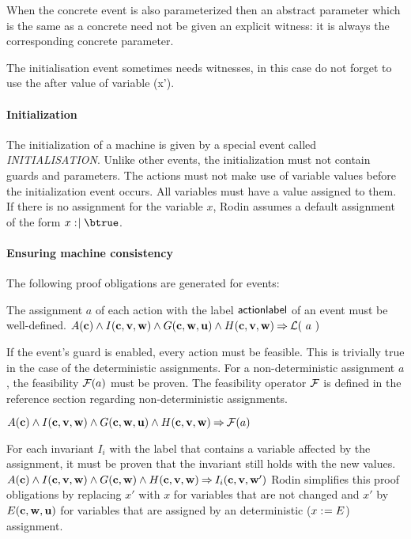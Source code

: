 When the concrete event is also parameterized then an abstract parameter which is the same as a concrete need not be given an explicit witness: it is always the corresponding concrete parameter.

The initialisation event sometimes needs witnesses, in this case do not forget to use the after value of variable (x'). 

\paragraph{Initialization}
The initialization of a machine is given by a special event called \textsl{INITIALISATION}.
Unlike other events, the initialization must not contain guards and parameters.
The actions must not make use of variable values before the initialization event occurs.
All variables must have a value assigned to them. If there is no assignment for the variable $x$, Rodin assumes a default assignment of the form $x\bcmsuch \btrue$.

\paragraph{Ensuring machine consistency}
\label{consistency_proof_obligations}
The following proof obligations are generated for events:

The assignment $a$ of each action with the label $\textsf{actionlabel}$ of an event must be well-defined.
  {}%
  {$A(\mathbf{c}) \land I(\mathbf{c},{\mathbf{v},\mathbf{w}}) \land G(\mathbf{c},\mathbf{w},\mathbf{u}) 
    \land H(\mathbf{c},{\mathbf{v},\mathbf{w}}) \mathbin\Rightarrow \mathcal{L}(~a~)$}
  
If the event's guard is enabled, every action must be feasible.
  This is trivially true in the case of the deterministic assignments.
  For a non-deterministic assignment $a$, the feasibility $\mathcal{F}(a)$ must be proven.
  The feasibility operator $\mathcal{F}$ is defined in the reference
  section regarding non-deterministic assignments.
  
  {$A(\mathbf{c}) \land I(\mathbf{c},{\mathbf{v},\mathbf{w}}) \land G(\mathbf{c},\mathbf{w},\mathbf{u})
    \land H(\mathbf{c},{\mathbf{v},\mathbf{w}}) \mathbin\Rightarrow \mathcal{F}(a)$}

For each invariant $I_i$ with the label  
  that contains a variable affected by the assignment, it must be proven
  that the invariant still holds with the new values.
  {}%
  {$A(\mathbf{c}) \land I(\mathbf{c},{\mathbf{v},\mathbf{w}}) \land G(\mathbf{c},\mathbf{w}) 
    \land H(\mathbf{c},{\mathbf{v},\mathbf{w}}) \mathbin\Rightarrow I_i(\mathbf{c},{\mathbf{v},\mathbf{w}}')$}
  Rodin simplifies this proof obligations by replacing $x'$ with $x$ for variables that are not
  changed and $x'$ by $E(\mathbf{c},\mathbf{w},\mathbf{u})$ 
  for variables that are assigned by an deterministic ($x \mathrel{:\mkern1mu=} E$) assignment.

